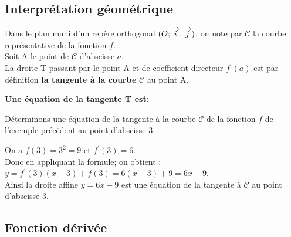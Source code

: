 \subsection*{Interprétation géométrique}
Dans le plan muni  d'un repère orthogonal  $ (O ;\overrightarrow{i},\overrightarrow{j}) $,  on note par $\mathscr{C}$   la courbe représentative de la fonction $ f $.\\  Soit A le point de $\mathscr{C}$  d'abscisse $ a. $\\
 La droite T passant par le point  A et de coefficient
directeur $f^{\prime} (a)$  est par définition  \textbf{ la tangente à la courbe} $\mathscr{C}$   au point A.


\begin{center}


\end{center}


\textbf{Une équation de la tangente T est:}  




\begin{example}

Déterminons une équation de la tangente  à la courbe $\mathscr{C}$ de  la fonction $ f $ de  l'exemple précèdent au point d'abscisse 3.

\medskip

 On a $ f(3)=3^{2}=9 $\; et  \; $ f^{\prime}(3)=6$.\\
 Donc en appliquant la formule; on obtient :\; $ y= f^{\prime}(3 )(x-3)+f(3)=6(x-3)+9=6x-9$.\\
 Ainsi la droite affine $ y=6x-9 $ est une équation de la tangente à $\mathscr{C}$   au point d'abscisse 3.
\end{example}



\subsection{Fonction dérivée}


